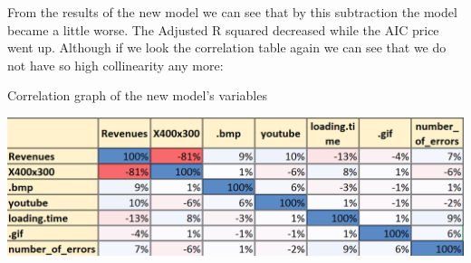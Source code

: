 \documentclass{book}
\begin{document}
From the results of the new model we can see that by this subtraction the model became a little worse. The Adjusted R squared decreased while the AIC price went up. Although if we look the correlation table again we can see that we do not have so high collinearity any more: 
\begin{table}[H]
\centering
\caption{Correlation graph of the new model's variables}
\begin{center}
\includegraphics[scale=0.6]{../R/photos/86_model_cor_3.png}     \\
\end{center}
\end{table}
\end{document}
